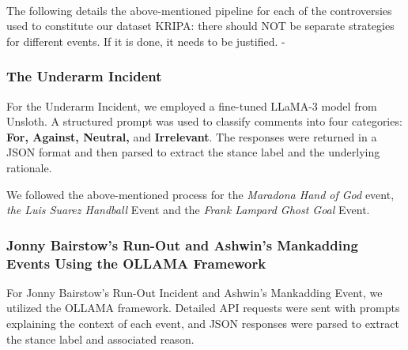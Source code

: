 \documentclass[sigconf, review]{acmart}
\begin{document}
\\



The following details the above-mentioned pipeline for each of the controversies used to constitute our dataset {\color{red}KRIPA: there should NOT be separate strategies for different events. If it is done, it needs to be justified}. - 
\\

\subsubsection{The Underarm Incident}
For the Underarm Incident, we employed a fine-tuned LLaMA-3 model from Unsloth. A structured prompt was used to classify comments into four categories: \textbf{For, Against, Neutral,} and \textbf{Irrelevant}. The responses were returned in a JSON format and then parsed to extract the stance label and the underlying rationale.

We followed the above-mentioned process for the \textit{Maradona Hand of God} event, \textit{the Luis Suarez Handball} Event and the \textit{Frank Lampard Ghost Goal} Event.
\\

\subsubsection{Jonny Bairstow's Run-Out and Ashwin's Mankadding Events Using the OLLAMA Framework}
For Jonny Bairstow's Run-Out Incident and Ashwin's Mankadding Event, we utilized the OLLAMA framework. Detailed API requests were sent with prompts explaining the context of each event, and JSON responses were parsed to extract the stance label and associated reason. 
\end{document}

